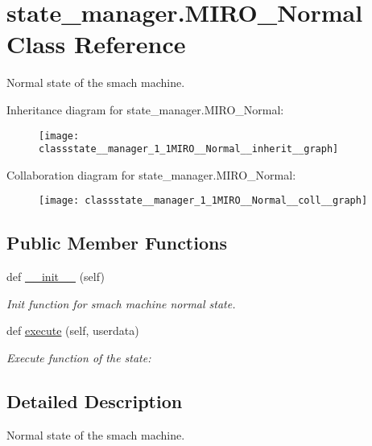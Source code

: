 \hypertarget{classstate__manager_1_1MIRO__Normal}{}\section{state\+\_\+manager.\+M\+I\+R\+O\+\_\+\+Normal Class Reference}
\label{classstate__manager_1_1MIRO__Normal}


Normal state of the smach machine.  




Inheritance diagram for state\+\_\+manager.\+M\+I\+R\+O\+\_\+\+Normal\+:\nopagebreak
\begin{figure}[H]
\begin{center}
\leavevmode
\texttt{[image: classstate\_\_manager\_1\_1MIRO\_\_Normal\_\_inherit\_\_graph]}
\end{center}
\end{figure}


Collaboration diagram for state\+\_\+manager.\+M\+I\+R\+O\+\_\+\+Normal\+:\nopagebreak
\begin{figure}[H]
\begin{center}
\leavevmode
\texttt{[image: classstate\_\_manager\_1\_1MIRO\_\_Normal\_\_coll\_\_graph]}
\end{center}
\end{figure}
\subsection*{Public Member Functions}
\begin{DoxyCompactItemize}
\item 
def \hyperlink{classstate__manager_1_1MIRO__Normal_a36a3ee79119b52beeebd6ee8c04d9501}{\+\_\+\+\_\+init\+\_\+\+\_\+} (self)
\begin{DoxyCompactList}\small\item\em Init function for smach machine normal state. \end{DoxyCompactList}\item 
def \hyperlink{classstate__manager_1_1MIRO__Normal_a4133da39ee6ec170623fc1d457b0729a}{execute} (self, userdata)
\begin{DoxyCompactList}\small\item\em Execute function of the state\+: \end{DoxyCompactList}\end{DoxyCompactItemize}


\subsection{Detailed Description}
Normal state of the smach machine. 



